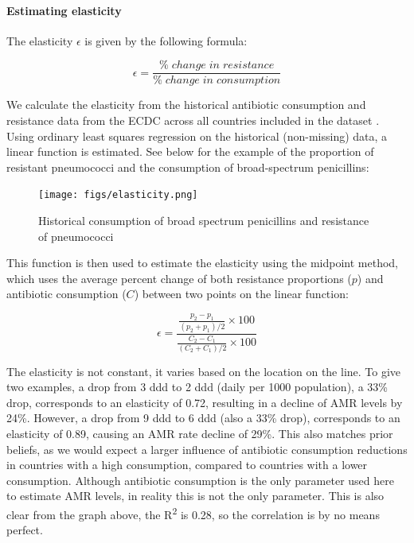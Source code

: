 \documentclass[
]{article}
\begin{document}
\hypertarget{estimating-elasticity}{%
\paragraph{Estimating elasticity}\label{estimating-elasticity}}

The elasticity \(\epsilon\) is given by the following formula:

\[
\epsilon = \frac{\% \; change \; in \; resistance }{\% \; change \; in \; consumption} 
\]

We calculate the elasticity from the historical antibiotic consumption and resistance data from the ECDC across all countries included in the dataset \autocite{europeancentrefordiseasepreventionandcontrolAntimicrobialResistance2021}. Using ordinary least squares regression on the historical (non-missing) data, a linear function is estimated. See below for the example of the proportion of resistant pneumococci and the consumption of broad-spectrum penicillins:

\begin{figure}
\centering
\texttt{[image: figs/elasticity.png]}
\caption{Historical consumption of broad spectrum penicillins and resistance of pneumococci}
\end{figure}

This function is then used to estimate the elasticity using the midpoint method, which uses the average percent change of both resistance proportions (\(p\)) and antibiotic consumption (\(C\)) between two points on the linear function:

\[
\epsilon = \frac{\frac{p_2 - p_1}{(p_2 + p_1) / 2} \times 100}{\frac{C_2 - C_1}{(C_2 + C_1) / 2} \times 100} 
\]

The elasticity is not constant, it varies based on the location on the line. To give two examples, a drop from 3 ddd to 2 ddd (daily per 1000 population), a 33\% drop, corresponds to an elasticity of 0.72, resulting in a decline of AMR levels by 24\%. However, a drop from 9 ddd to 6 ddd (also a 33\% drop), corresponds to an elasticity of 0.89, causing an AMR rate decline of 29\%. This also matches prior beliefs, as we would expect a larger influence of antibiotic consumption reductions in countries with a high consumption, compared to countries with a lower consumption. Although antibiotic consumption is the only parameter used here to estimate AMR levels, in reality this is not the only parameter. This is also clear from the graph above, the R\textsuperscript{2} is 0.28, so the correlation is by no means perfect.
\end{document}
